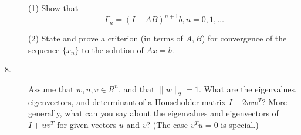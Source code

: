 \documentclass{article}
\begin{document}
\begin{description}
\item[\quad] (1)
Show that
$$\Gamma_n = (I - AB)^{n+1} b, n =0,1, \dots$$

\item[\quad] (2)
State and prove a criterion (in terms of $A, B$) for convergence of the
sequence $\{x_n\}$ to the solution of $Ax=b$.

\item[8.]
Assume that $w,u,v \in R^n$, and that $\parallel w \parallel_2 = 1$. What
are the eigenvalues, eigenvectors, and determinant of a Householder matrix
$I-2ww^T$? More generally, what can you say about the eigenvalues and
eigenvectors of $I+uv^T$ for given vectors $u$ and $v$? (The case
$v^T u =0$ is special.)




\end{description}    
\end{document}
